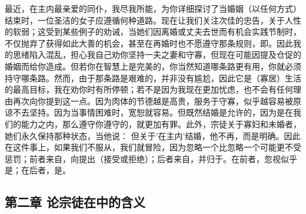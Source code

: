 最近，在主内最亲爱的同仆，我尽我所能，为你详细探讨了当婚姻（以任何方式）结束时，一位圣洁的女子应遵循何种道路。现在让我们关注次佳的忠告，关于人性的软弱；这受到某些例子的劝诫，当她们因离婚或丈夫去世而有机会实践节制时，不仅抛弃了获得如此大善的机会，甚至在再婚时也不愿遵守那条规则，即。因此我的思绪陷入混乱，担心我自己劝你坚持一夫之妻和守寡，但现在可能因提及仓促的婚姻而给你造成。但若你在智慧上是完美的，你当然知道哪条路更有用，你就必须持守哪条路。然而，由于那条路是艰难的，并非没有尴尬，因此它是（寡居）生活的最高目标，我在劝你时有所停顿；若不是因为我现在更加忧虑，也不会有任何理由再次向你提到这一点。因为肉体的节德越是高贵，服务于守寡，似乎越容易被原谅不去坚持。因为当事情困难时，宽恕就容易。但既然结婚是允许的，因为是在我们的能力之内，那么遵守你遵守的，就更加有罪。此外，宗徒关于寡妇和未婚者，她们永久保持那种状态，当他说： 但关于'在主内'结婚，他不再，而是明确。因此在这件事上，如果我们不服从，我们就冒险，因为忽略一个比忽略一个可能更不受惩罚；前者来自，向提出（接受或拒绝）；后者来自，并归于。在前者，忽视似乎是；在后者，是。\par


\subsection{第二章 论宗徒在中的含义}

